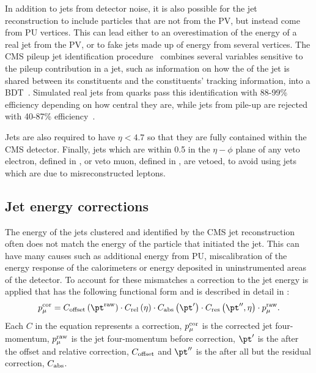 In addition to jets from detector noise, it is also possible for the jet reconstruction to include particles that are not from the \ac{PV}, but instead come from \ac{PU} vertices. This can lead either to an overestimation of the energy of a real jet from the \ac{PV}, or to fake jets made up of energy from several vertices. The CMS pileup jet identification procedure~\cite{CMS-PAS-JME-13-005} combines several variables sensitive to the pileup contribution in a jet, such as information on how the \pt of the jet is shared between its constituents and the constituents' tracking information, into a \ac{BDT}~\cite{TMVA}. Simulated real jets from quarks pass this identification with 88-99\% efficiency depending on how central they are, while jets from pile-up are rejected with 40-87\% efficiency~\cite{CMS-PAS-JME-13-005}.

Jets are also required to have $\eta<4.7$ so that they are fully contained within the \ac{CMS} detector. Finally, jets which are within 0.5 in the $\eta-\phi$ plane of any veto electron, defined in , or veto muon, defined in , are vetoed, to avoid using jets which are due to misreconstructed leptons.

\subsection{Jet energy corrections}
\label{sec:jec}
The energy of the jets clustered and identified by the CMS jet reconstruction often does not match the energy of the particle that initiated the jet. This can have many causes such as additional energy from \ac{PU}, miscalibration of the energy response of the calorimeters or energy deposited in uninstrumented areas of the detector. To account for these mismatches a correction to the jet energy is applied that has the following functional form and is described in detail in : 
\begin{equation}
  p_{\mu}^{\rm{cor}}=C_{\rm{offset}}\left(\pt^{\rm{raw}}\right)\cdot C_{\rm{rel}}\left(\eta\right)\cdot C_{\rm{abs}}\left(\pt'\right)\cdot C_{\rm{res}}\left(\pt'',\eta\right)\cdot p_{\mu}^{\rm{raw}}.
\end{equation}
Each $C$ in the equation represents a correction, $p_{\mu}^{\rm{cor}}$ is the corrected jet four-momentum, $p_{\mu}^{\rm{raw}}$ is the jet four-momentum before correction, $\pt'$ is the \pt after the offset and relative correction, $C_{\rm{offset}}$ and $\pt''$ is the \pt after all but the residual correction, $C_{\rm{abs}}$.

